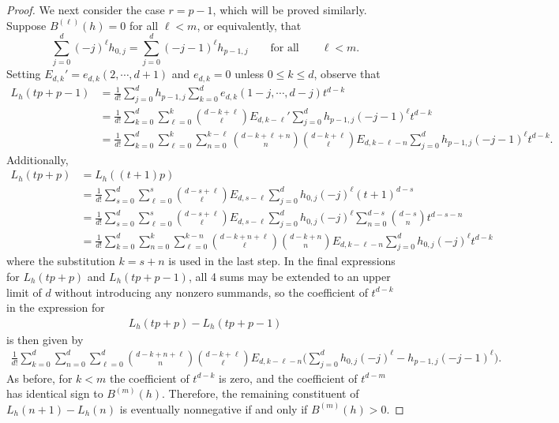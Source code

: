 \documentclass[12pt]{amsart}
\theoremstyle{definition}
\numberwithin{equation}{section}
\renewcommand\>{\rangle}
\newcommand\<{\langle}
\newcommand\0{\mathbf{0}}
\begin{document}
\begin{proof}
We next consider the case $r=p-1$, which will be proved similarly.
Suppose  $B^{(\ell)}(h)=0$ for all $\ell<m$, or equivalently, that
$$
\sum_{j=0}^d (-j)^\ell h_{0,j}
= \sum_{j=0}^d (-j-1)^\ell h_{p-1,j}
\qquad \text{for all} \qquad
\ell < m.
$$
Setting $E_{d,k}' = e_{d,k}(2, \cdots, d+1)$ and $e_{d,k} = 0$ unless $0 \le k \le d$, observe that
\begin{align*}
L_h(tp + p - 1)
&= \frac{1}{d!} \sum_{j = 0}^d h_{p-1,j} \sum_{k = 0}^d e_{d,k}(1-j, \cdots, d-j) t^{d-k}
\\
&= \frac{1}{d!} \sum_{k = 0}^d \sum_{\ell = 0}^k \binom{d-k+\ell}{\ell} E_{d,k-\ell}' \sum_{j = 0}^d h_{p-1,j} (-j-1)^\ell t^{d-k}
\\
&= \frac{1}{d!} \sum_{k = 0}^d \sum_{\ell = 0}^k \sum_{n = 0}^{k-\ell} \binom{d-k+\ell+n}{n} \binom{d-k+\ell}{\ell} E_{d,k-\ell-n} \sum_{j = 0}^d h_{p-1,j} (-j-1)^\ell t^{d-k}.
\end{align*}
Additionally,
\begin{align*}
L_h(tp + p)
&= L_h((t+1)p)
\\
&= \frac{1}{d!} \sum_{s = 0}^d \sum_{\ell = 0}^s \binom{d-s+\ell}{\ell} E_{d,s-\ell} \sum_{j = 0}^d h_{0,j} (-j)^\ell (t+1)^{d-s}
\\
&= \frac{1}{d!} \sum_{s = 0}^d \sum_{\ell = 0}^s \binom{d-s+\ell}{\ell} E_{d,s-\ell} \sum_{j = 0}^d h_{0,j} (-j)^\ell \sum_{n = 0}^{d-s} \binom{d-s}{n} t^{d-s-n}
\\
&= \frac{1}{d!} \sum_{k = 0}^d \sum_{n = 0}^k \sum_{\ell = 0}^{k-n} \binom{d-k+n+\ell}{\ell} \binom{d-k+n}{n} E_{d,k-\ell-n} \sum_{j = 0}^d h_{0,j} (-j)^\ell t^{d-k}
\end{align*}
where the substitution $k = s + n$ is used in the last step.  In the final expressions for $L_h(tp + p)$ and $L_h(tp + p - 1)$, all 4 sums may be extended to an upper limit of $d$ without introducing any nonzero summands, so the coefficient of $t^{d-k}$ in the expression for 
\begin{align*}
L_h(tp + p) - L_h(tp + p - 1)
\end{align*}
is then given by
\begin{align*}
\frac{1}{d!} \sum_{k = 0}^d \sum_{n = 0}^d \sum_{\ell = 0}^d \binom{d-k+n+\ell}{n} \binom{d-k+\ell}{\ell} E_{d,k-\ell-n} \bigg(\sum_{j = 0}^d h_{0,j}(-j)^\ell - h_{p-1,j}(-j-1)^\ell \bigg).
\end{align*}
As before, for $k < m$ the coefficient of $t^{d-k}$ is zero, and the coefficient of $t^{d-m}$ has identical sign to $B^{(m)}(h)$. 
Therefore, the remaining constituent of $L_h(n+1) - L_h(n)$ is eventually nonnegative if and only if $B^{(m)}(h) > 0$.
\end{proof}
\end{document}
